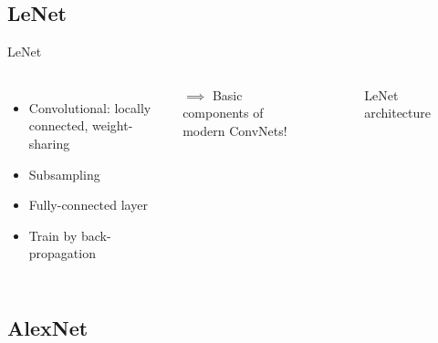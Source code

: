 \documentclass[aspectratio=169]{beamer}
\begin{document}
\subsection{LeNet}
\begin{frame}{LeNet
}
  \begin{columns}[T,c,onlytextwidth]
    \begin{itemize}
        \item Convolutional: locally connected, weight-sharing
        \item Subsampling
        \item Fully-connected layer
        \item Train by back-propagation
    \end{itemize}
    $\implies$ Basic components of modern ConvNets!
\begin{figure}
\caption{LeNet architecture}
\label{fig:lenet}
\end{figure}
  \end{columns}
\end{frame}

\subsection{AlexNet}
\end{document}
